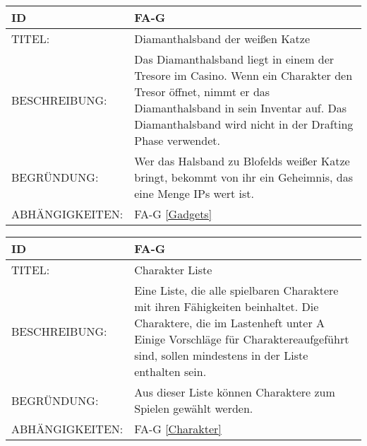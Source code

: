 \begin{tabularx}{16cm}{l|X}
	{table}\label{Diamanthalsband der weissen Katze}
	\textbf{ID} & \textbf{FA-G \arabic{table}} \\
	\hline
	TITEL: & Diamanthalsband der weißen Katze \\
	\hline
	BESCHREIBUNG: & Das Diamanthalsband liegt in einem der Tresore im Casino. Wenn ein Charakter den Tresor öffnet, nimmt er das Diamanthalsband in sein Inventar auf. Das Diamanthalsband wird nicht in der Drafting Phase verwendet. \\
	\hline
	BEGRÜNDUNG: &  Wer das Halsband zu Blofelds weißer Katze bringt, bekommt von ihr ein Geheimnis, das eine Menge IPs wert ist. \\
	\hline
	ABHÄNGIGKEITEN: & FA-G \ref{Gadgets} \\
\end{tabularx}

\begin{tabularx}{16cm}{l|X}
	{table}\label{Charakter Liste}
	\textbf{ID} & \textbf{FA-G \arabic{table}} \\
	\hline
	TITEL: & Charakter Liste \\
	\hline
	BESCHREIBUNG: & Eine Liste, die alle spielbaren Charaktere mit ihren Fähigkeiten beinhaltet. Die Charaktere, die im Lastenheft unter \glqq A Einige Vorschläge für Charaktere\grqq aufgeführt sind, sollen mindestens in der Liste enthalten sein.\\
	\hline
	BEGRÜNDUNG: & Aus dieser Liste können Charaktere zum Spielen gewählt werden.\\
	\hline
	ABHÄNGIGKEITEN: & FA-G \ref{Charakter}\\
\end{tabularx}


